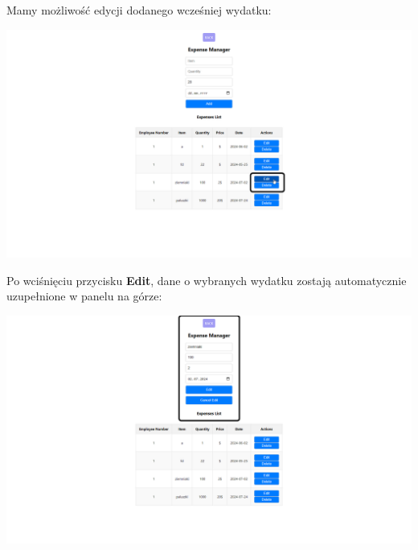 \documentclass[12pt]{article}
\begin{document}
\begin{minipage}{\textwidth}
\noindent Mamy możliwość edycji dodanego wcześniej wydatku:
\begin{center}
\includegraphics[width=\textwidth]{media/Expenses_edit.png}
\end{center}
\end{minipage}

\begin{minipage}{\textwidth}
\noindent Po wciśnięciu przycisku \textbf{Edit}, dane o wybranych wydatku zostają automatycznie uzupełnione w panelu na górze:
\begin{center}
\includegraphics[width=\textwidth]{media/Expenses_editValues.png}
\end{center}
\end{minipage}
\end{document}
